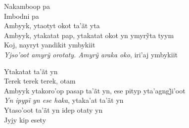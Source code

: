 \smallskip
 \begin{center}\end{center}
 \smallskip

\noindent   Nakamboop pa\\
  Imbodni pa\\
  Ambyyk, ytaotyt okot ta'ãt yta\\
  Ambyyk, ytakatat pap, ytakatat okot yn ymyrỹta tyym\\
  Koj, nayryt yandikit ymbykiit\\
  \textit{Yjso’oot amyrỹ orotaty. Amyrỹ araka oko}, iri’aj ymbykiit

\smallskip
 \begin{center}\end{center}
 \smallskip

\noindent   Ytakatat ta'ãt yn\\
  Terek terek terek, otam\\
  Ambyyk ytakoro’op pasap ta’ãt yn, ese pityp yta’agngj̃i’oot\\
  \textit{Yn ipypĩ yn ese haka}, ytaka’at ta’ãt yn\\
  Ytaso'oot ta'ãt yn idep otaty yn\\
  Jyjy kip esety

\smallskip
 \begin{center}\end{center}
 \smallskip

